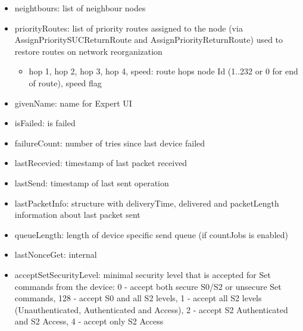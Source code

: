 \begin {itemize}
\begin {itemize}
\begin {itemize}
\item neightbours: list of neighbour nodes
\item priorityRoutes: list of priority routes assigned to the node (via AssignPrioritySUCReturnRoute and AssignPriorityReturnRoute) used to restore routes on network reorganization
\begin {itemize}
\item hop 1, hop 2, hop 3, hop 4, speed: route hops node Id (1..232 or 0 for end of route), speed flag
\end {itemize}

\item givenName: name for Expert UI
\item isFailed: is failed
\item failureCount: number of tries since last device failed
\item lastRecevied: timestamp of last packet received
\item lastSend: timestamp of last sent operation
\item lastPacketInfo: structure with deliveryTime, delivered and packetLength information about last packet sent
\item queueLength: length of device specific send queue (if countJobs is enabled)
\item lastNonceGet: internal
\item acceptSetSecurityLevel: minimal security level that is accepted for Set commands from the device: 0 - accept both secure S0/S2 or unsecure Set commands, 128 - accept S0 and all S2 levels, 1 - accept all S2 levels (Unauthenticated, Authenticated and Access), 2 - accept S2 Authenticated and S2 Access, 4 - accept only S2 Access
\end {itemize}


\end{itemize}
\end{itemize}
